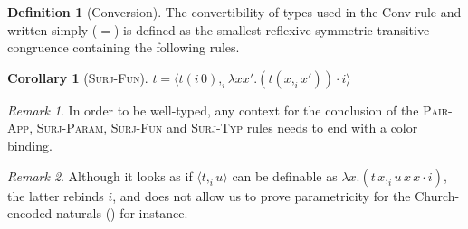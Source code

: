 \documentclass[english]{PaperTools/latex/entcs}
\theoremstyle{plain}
\newtheorem{corollary}[theorem]{Corollary}
\theoremstyle{definition}
\newtheorem{definition}[theorem]{Definition}
\theoremstyle{remark}
\newtheorem*{remark}{Remark}
\newcommand\CP[3]{(#2,_{#1} #3)}
\newcommand\CTimes[2]{(#2) ×_{#1}}
\newcommand\param[1]{\!\cdot\!#1}
\newcommand\op[1]{∋_{#1}}
\newcommand\fp[3]{⟨#2 ,_{#1} #3⟩}
\newcommand\mor[2]{({#1}\,{#2})}
\newcommand\proj[2]{{#2}\mor{#1}0}
\def\El#1{\mathrm{El}(#1)}
\begin{document}
\vspace{-.25\baselineskip}
\begin{definition}[Conversion]
\label{def:conversion}
The convertibility of types used in the {\sc Conv} rule and written
simply ($=$) is defined as the smallest reflexive-symmetric-transitive
congruence containing the following rules.
\end{definition}
%
\begin{corollary}[\textsc{Surj-Fun}]
  \label{cor:surj-fun}
  $t = \fp i {\proj i t} {λx x'. (t \CP i x {x'}) \param i}$
\end{corollary}

\vspace{-.25\baselineskip}
\begin{remark}
  In order to be well-typed, any context for the conclusion of the
  \textsc{Pair-App}, \textsc{Surj-Param}, \textsc{Surj-Fun} and
  \textsc{Surj-Typ} rules needs to end with a color binding.
\end{remark}
\begin{remark}
  Although it looks as if $\fp i t u$ can be definable as
  $λx. \CP i {t\,x} {u\, x\, x\param i}$, the latter rebinds $i$, and
  does not allow us to prove parametricity for the Church-encoded
  naturals () for instance.
\end{remark}

\end{document}
